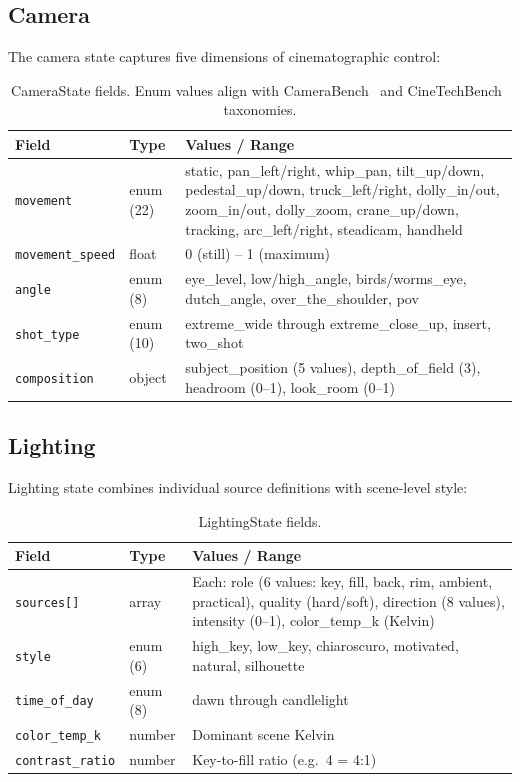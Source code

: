 \documentclass{article}
\begin{document}
\subsection{Camera}

The camera state captures five dimensions of cinematographic control:

\begin{table}[H]
\centering
\begin{tabular}{@{}llp{7cm}@{}}
\toprule
\textbf{Field} & \textbf{Type} & \textbf{Values / Range} \\
\midrule
\texttt{movement} & enum (22) & static, pan\_left/right, whip\_pan, tilt\_up/down, pedestal\_up/down, truck\_left/right, dolly\_in/out, zoom\_in/out, dolly\_zoom, crane\_up/down, tracking, arc\_left/right, steadicam, handheld \\
\texttt{movement\_speed} & float & 0 (still) -- 1 (maximum) \\
\texttt{angle} & enum (8) & eye\_level, low/high\_angle, birds/worms\_eye, dutch\_angle, over\_the\_shoulder, pov \\
\texttt{shot\_type} & enum (10) & extreme\_wide through extreme\_close\_up, insert, two\_shot \\
\texttt{composition} & object & subject\_position (5 values), depth\_of\_field (3), headroom (0--1), look\_room (0--1) \\
\bottomrule
\end{tabular}
\caption{CameraState fields. Enum values align with CameraBench~\cite{camerabench2025} and CineTechBench~\cite{cinetechbench2025} taxonomies.}
\label{tab:camera}
\end{table}

\subsection{Lighting}

Lighting state combines individual source definitions with scene-level style:

\begin{table}[H]
\centering
\begin{tabular}{@{}llp{7cm}@{}}
\toprule
\textbf{Field} & \textbf{Type} & \textbf{Values / Range} \\
\midrule
\texttt{sources[]} & array & Each: role (6 values: key, fill, back, rim, ambient, practical), quality (hard/soft), direction (8 values), intensity (0--1), color\_temp\_k (Kelvin) \\
\texttt{style} & enum (6) & high\_key, low\_key, chiaroscuro, motivated, natural, silhouette \\
\texttt{time\_of\_day} & enum (8) & dawn through candlelight \\
\texttt{color\_temp\_k} & number & Dominant scene Kelvin \\
\texttt{contrast\_ratio} & number & Key-to-fill ratio (e.g.\ 4 = 4:1) \\
\bottomrule
\end{tabular}
\caption{LightingState fields.}
\label{tab:lighting}
\end{table}
\end{document}
